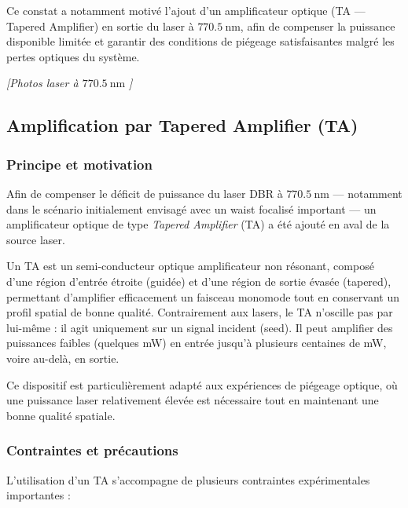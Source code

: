 \medskip

Ce constat a notamment motivé l’ajout d’un amplificateur optique (TA — Tapered Amplifier) en sortie du laser à $770.5~\text{nm}$, afin de compenser la puissance disponible limitée et garantir des conditions de piégeage satisfaisantes malgré les pertes optiques du système.

\begin{center}
\textit{[Photos laser à $770.5~\text{nm}$ ]}
\end{center}


\subsection{Amplification par Tapered Amplifier (TA)}

\subsubsection*{Principe et motivation}

Afin de compenser le déficit de puissance du laser DBR à $770.5~\text{nm}$ — notamment dans le scénario initialement envisagé avec un waist focalisé important — un amplificateur optique de type \textit{Tapered Amplifier} (TA) a été ajouté en aval de la source laser.

Un TA est un semi-conducteur optique amplificateur non résonant, composé d'une région d'entrée étroite (guidée) et d'une région de sortie évasée (tapered), permettant d'amplifier efficacement un faisceau monomode tout en conservant un profil spatial de bonne qualité. Contrairement aux lasers, le TA n'oscille pas par lui-même : il agit uniquement sur un signal incident (seed). Il peut amplifier des puissances faibles (quelques mW) en entrée jusqu’à plusieurs centaines de mW, voire au-delà, en sortie.

Ce dispositif est particulièrement adapté aux expériences de piégeage optique, où une puissance laser relativement élevée est nécessaire tout en maintenant une bonne qualité spatiale.

\subsubsection*{Contraintes et précautions}

L'utilisation d’un TA s’accompagne de plusieurs contraintes expérimentales importantes :

